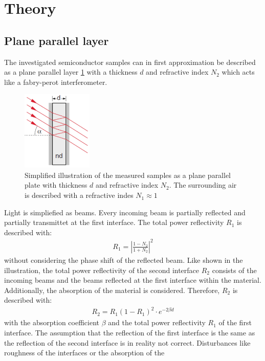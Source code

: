\nopagebreak
\section{Theory}
\subsection{Plane parallel layer}
The investigated semiconductor samples can in first approximation be described as a plane parallel 
layer \ref{fig:fabry-perot} with a thickness $d$ and refractive index $N_2$ which acts like a fabry-perot interferometer.
\begin{figure}[h]
    \centering
    \includegraphics[width=0.3\textwidth]{Images/fabry-perot.png}
    \caption{Simplified illustration of the measured samples as a plane parallel plate
    with thickness $d$ and refractive index $N_2$. The surrounding air is described with a 
    refractive indes $N_1\approx1$ \cite{??}}
    \label{fig:fabry-perot}
\end{figure}
Light is simpliefied as beams. Every incoming beam is partially reflected and 
partially transmittet at the first interface. The total power reflectivity $R_1$ is described with:
\begin{align}
    R_1 = \left\lvert \frac{1 - N_2}{1 + N_2} \right\rvert^2 \label{eq:R1}
\end{align}
without considering the phase shift of the reflected beam. Like shown in the illustration, the total
power reflectivity of the second interface $R_2$ consists of the incoming beams and the beams reflected
at the first interface within the material. Additionally, the absorption of the material is considered.
Therefore, $R_2$ is described with:
\begin{align}
    R_2 = R_1(1-R_1)^2 \cdot e^{-2\beta d} \label{eq:R2}
\end{align}
with the absorption coefficient $\beta$ and the total power reflectivity $R_1$ of the first interface.
The assumption that the reflection of the first interface is the same as the reflection of the second
interface is in reality not correct. Disturbances like roughness of the interfaces or the absorption of the
